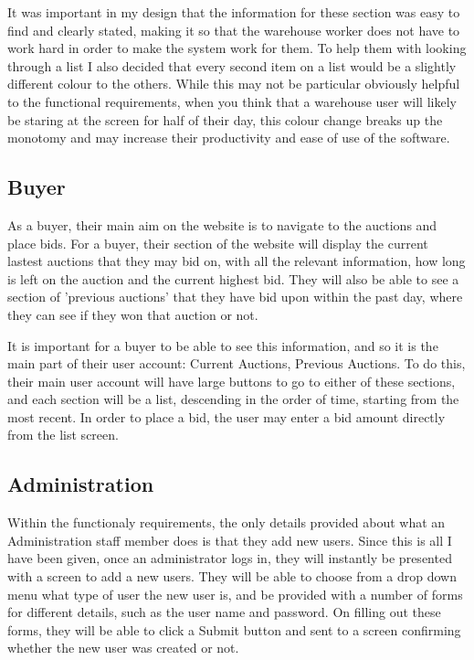\documentclass{article}
\begin{document}
It was important in my design that the information for these section was easy to find and clearly stated, making it so that the warehouse worker does not have to work hard in order to make the system work for them. To help them with looking through a list I also decided that every second item on a list would be a slightly different colour to the others. While this may not be particular obviously helpful to the functional requirements, when you think that a warehouse user will likely be staring at the screen for half of their day, this colour change breaks up the monotomy and may increase their productivity and ease of use of the software.

\subsection{Buyer}

As a buyer, their main aim on the website is to navigate to the auctions and place bids. For a buyer, their section of the website will display the current lastest auctions that they may bid on, with all the relevant information, how long is left on the auction and the current highest bid. They will also be able to see a section of 'previous auctions' that they have bid upon within the past day, where they can see if they won that auction or not.

It is important for a buyer to be able to see this information, and so it is the main part of their user account: Current Auctions, Previous Auctions. To do this, their main user account will have large buttons to go to either of these sections, and each section will be a list, descending in the order of time, starting from the most recent. In order to place a bid, the user may enter a bid amount directly from the list screen.

\subsection{Administration}

Within the functionaly requirements, the only details provided about what an Administration staff member does is that they add new users. Since this is all I have been given, once an administrator logs in, they will instantly be presented with a screen to add a new users. They will be able to choose from a drop down menu what type of user the new user is, and be provided with a number of forms for different details, such as the user name and password. On filling out these forms, they will be able to click a Submit button and sent to a screen confirming whether the new user was created or not.
\end{document}
